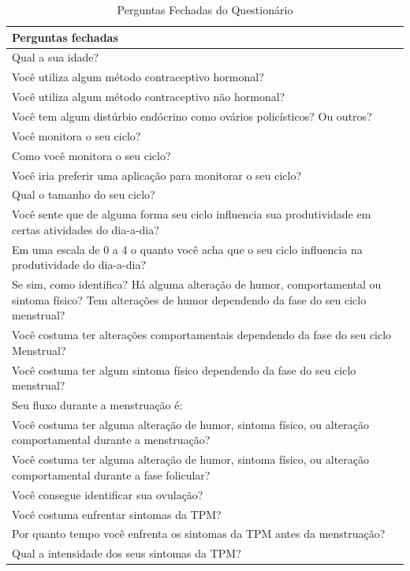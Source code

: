 \begin{table}[htbp]
    \centering
    \caption{Perguntas Fechadas do Questionário}
    \label{tab07}
    \begin{tabular}{p{15cm}}
        \toprule
        \textbf{Perguntas fechadas} \\
        \midrule
         Qual a sua idade?   \\
        \midrule
         Você utiliza algum método contraceptivo hormonal?   \\
        \midrule
         Você utiliza algum método contraceptivo não hormonal?   \\
        \midrule
          Você tem algum distúrbio endócrino como ovários policísticos? Ou outros?   \\
        \midrule
          Você monitora o seu ciclo? \\
        \midrule
          Como você monitora o seu ciclo?  \\
        \midrule
          Você iria preferir uma aplicação para monitorar o seu ciclo?\\
        \midrule
          Qual o tamanho do seu ciclo? \\
        \midrule
          Você sente que de alguma forma seu ciclo influencia sua produtividade em certas atividades do dia-a-dia? \\
        \midrule
          Em uma escala de 0 a 4 o quanto você acha que o seu ciclo influencia na produtividade do dia-a-dia? \\
        \midrule
         Se sim, como identifica? Há alguma alteração de humor, comportamental ou sintoma físico? Tem alterações de humor dependendo da fase do seu ciclo menstrual? \\
        \midrule
         Você costuma ter alterações comportamentais dependendo da fase do seu ciclo Menstrual? \\
        \midrule
         Você costuma ter algum sintoma físico dependendo da fase do seu ciclo menstrual? \\
        \midrule
         Seu fluxo durante a menstruação é:\\
        \midrule
         Você costuma ter alguma alteração de humor, sintoma físico, ou alteração comportamental durante a menstruação? \\
        \midrule
         Você costuma ter alguma alteração de humor, sintoma físico, ou alteração comportamental durante a fase folicular? \\
        \midrule
         Você consegue identificar sua ovulação? \\
        \midrule
         Você costuma enfrentar sintomas da TPM? \\
        \midrule
         Por quanto tempo você enfrenta os sintomas da TPM antes da menstruação? \\
        \midrule
         Qual a intensidade dos seus sintomas da TPM? \\
        \bottomrule
    \end{tabular}
\end{table}


